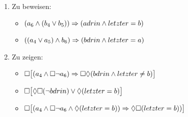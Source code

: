 \documentclass[a4paper,twoside,12pt]{article}
\begin{document}
\begin{description}
\begin{enumerate}
	\item Zu beweisen:
	\begin{itemize}
		\item $(a_6 \wedge (b_4 \vee b_5)) \Rightarrow (adrin \wedge letzter = b)$
		\item $((a_4 \vee a_5) \wedge b_6) \Rightarrow (bdrin \wedge letzter = a)$
	\end{itemize}
	\item Zu zeigen:
	\begin{itemize}
		\item $\Box \big [(a_4 \wedge \Box \neg a_6) \Rightarrow \Box \lozenge (bdrin \wedge letzter \neq b) \big ]$
		\item $\Box \big [\lozenge \Box (\neg bdrin) \vee \lozenge (letzter = b) \big]$
		\item $\Box \big [(a_4 \wedge \Box \neg a_6 \wedge \lozenge (letzter = b)) \Rightarrow \lozenge \Box (letzter = b)) \big ]$
	\end{itemize}
\end{enumerate}

\end{description}
\end{document}
